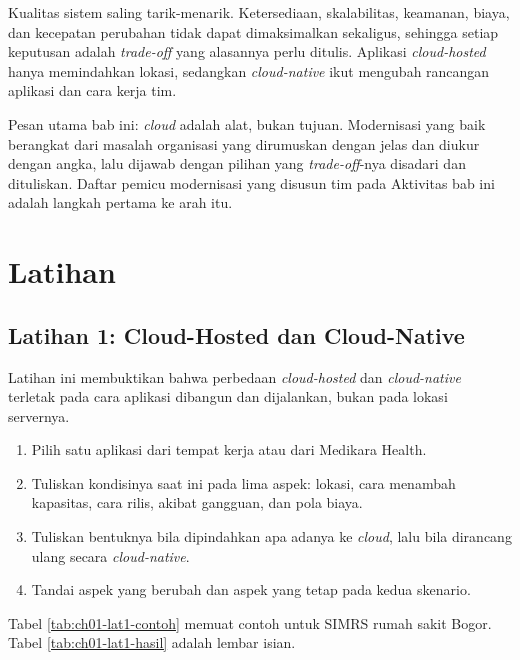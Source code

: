 Kualitas sistem saling tarik-menarik. Ketersediaan, skalabilitas, keamanan, biaya, dan
kecepatan perubahan tidak dapat dimaksimalkan sekaligus, sehingga setiap keputusan
adalah \textit{trade-off} yang alasannya perlu ditulis. Aplikasi \textit{cloud-hosted}
hanya memindahkan lokasi, sedangkan \textit{cloud-native} ikut mengubah rancangan
aplikasi dan cara kerja tim.

Pesan utama bab ini: \textit{cloud} adalah alat, bukan tujuan. Modernisasi yang baik
berangkat dari masalah organisasi yang dirumuskan dengan jelas dan diukur dengan angka,
lalu dijawab dengan pilihan yang \textit{trade-off}-nya disadari dan dituliskan. Daftar
pemicu modernisasi yang disusun tim pada Aktivitas bab ini adalah langkah pertama ke
arah itu.

\section{Latihan}

\subsection*{Latihan 1: Cloud-Hosted dan Cloud-Native}

Latihan ini membuktikan bahwa perbedaan \textit{cloud-hosted} dan \textit{cloud-native}
terletak pada cara aplikasi dibangun dan dijalankan, bukan pada lokasi servernya.

\begin{enumerate}
  \item Pilih satu aplikasi dari tempat kerja atau dari Medikara Health.
  \item Tuliskan kondisinya saat ini pada lima aspek: lokasi, cara menambah kapasitas,
        cara rilis, akibat gangguan, dan pola biaya.
  \item Tuliskan bentuknya bila dipindahkan apa adanya ke \textit{cloud}, lalu bila
        dirancang ulang secara \textit{cloud-native}.
  \item Tandai aspek yang berubah dan aspek yang tetap pada kedua skenario.
\end{enumerate}

Tabel \ref{tab:ch01-lat1-contoh} memuat contoh untuk SIMRS rumah sakit Bogor. Tabel
\ref{tab:ch01-lat1-hasil} adalah lembar isian.


